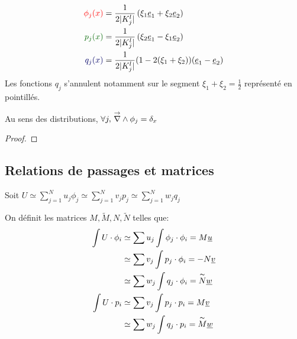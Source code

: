 \begin{minipage}{0.45\textwidth}
\begin{align*}
	\color{red}{\phi_j(x)} &= \frac{1}{2|K_j^l|}\left(\xi_1 \v e_1 + \xi_2 \v e_2\right)\\
	\color{black!60!green}{p_j(x)} &= \frac{1}{2|K_j^l|}\left(\xi_2 \v e_1 -\xi_1 \v e_2\right)\\
	\color{black!60!blue}{q_j(x)} &= \frac{1}{2|K_j^l|}(1-2(\xi_1+\xi_2))(\v e_1 -\v e_2)
\end{align*}
Les fonctions $q_j$ s'annulent notamment sur le segment $\xi_1+\xi_2=\frac{1}{2}$ représenté en pointillés. 
\end{minipage}
\begin{minipage}{0.53\textwidth}
	\centering
	\begin{tikzpicture}[scale=2.5]
	
	\end{tikzpicture}
\end{minipage}

\begin{prop}
Au sens des distributions, $\forall j,\, \vrot \phi_j =
\delta_x$
\end{prop}
\begin{proof}
\end{proof}


\subsection{Relations de passages et matrices}
Soit $ U \simeq \sum\limits_{j=1}^N u_j \phi_j \simeq \sum\limits_{j=1}^N v_j p_j \simeq \sum\limits_{j=1}^N w_j q_j$

On définit les matrices $M,\tilde M, N,\tilde N$ telles que:
\begin{align*}
  \int U \cdot \phi_i &\simeq \sum u_j \int \phi_j \cdot \phi_i = M\v u \\
  & \simeq \sum v_j \int p_j \cdot \phi_i = -N\v v\\
  & \simeq \sum w_j \int q_j \cdot \phi_i = \tilde{N}\v w \\
  \int U \cdot p_i &\simeq \sum v_j \int p_j \cdot p_i = M\v v \\
  &\simeq \sum w_j \int q_j \cdot p_i = \tilde M\v w
\end{align*}
